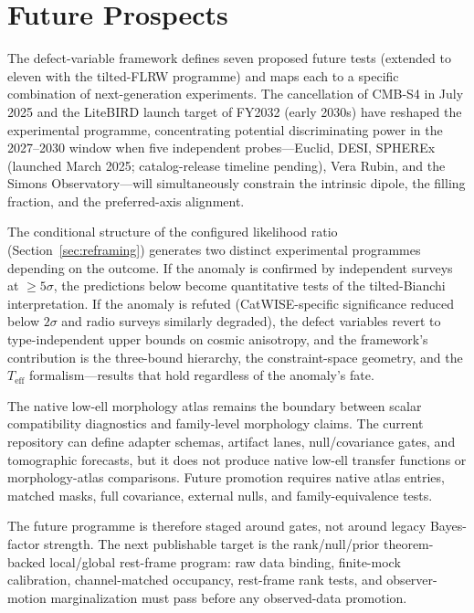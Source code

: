 
\chapter{Future Prospects}\label{ch:future}

The defect-variable framework defines seven proposed
future tests (extended to eleven with the tilted-FLRW programme)
and maps each to a specific combination of next-generation
experiments.  The cancellation of CMB-S4 in July
2025 and the LiteBIRD launch target of FY2032 (early 2030s) have
reshaped the experimental programme, concentrating potential
discriminating power in the 2027--2030 window when five
independent probes---Euclid, DESI, SPHEREx (launched March 2025;
catalog-release timeline pending), Vera Rubin, and the
Simons Observatory---will simultaneously constrain the intrinsic
dipole, the filling fraction, and the preferred-axis alignment.

The conditional structure of the configured likelihood ratio
(Section~\ref{sec:reframing}) generates two distinct experimental
programmes depending on the outcome.  If the anomaly is confirmed
by independent surveys at $\geq 5\sigma$, the predictions below
become quantitative tests of the tilted-Bianchi interpretation.
If the anomaly is refuted (CatWISE-specific significance reduced
below $2\sigma$ and radio surveys similarly degraded), the defect
variables revert to type-independent upper bounds on cosmic
anisotropy, and the framework's contribution is the
three-bound hierarchy, the constraint-space geometry, and the
$T_{\mathrm{eff}}$ formalism---results that hold regardless of
the anomaly's fate.

The native low-ell morphology atlas remains the boundary between
scalar compatibility diagnostics and family-level morphology claims.
The current repository can define adapter schemas, artifact lanes,
null/covariance gates, and tomographic forecasts, but it does not
produce native low-ell transfer functions or morphology-atlas
comparisons.  Future promotion requires native atlas entries,
matched masks, full covariance, external nulls, and family-equivalence
tests.

The future programme is therefore staged around gates, not around
legacy Bayes-factor strength.  The next publishable target is the
rank/null/prior theorem-backed local/global rest-frame program:
raw data binding, finite-mock calibration, channel-matched
occupancy, rest-frame rank tests, and observer-motion
marginalization must pass before any observed-data promotion.


